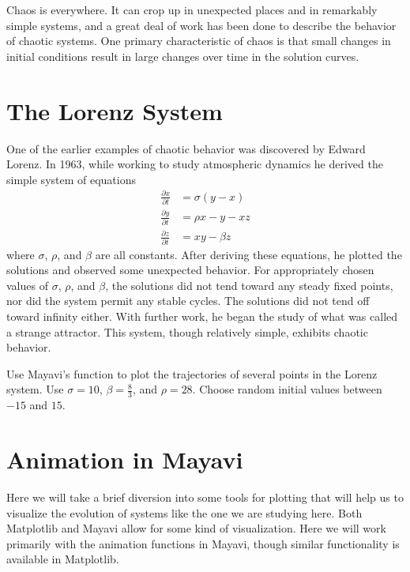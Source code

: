 \label{lab:lorenz}


Chaos is everywhere.
It can crop up in unexpected places and in remarkably simple systems, and a great deal of work has been done to describe the behavior of chaotic systems.
One primary characteristic of chaos is that small changes in initial conditions result in large changes over time in the solution curves.

\section*{The Lorenz System}
One of the earlier examples of chaotic behavior was discovered by Edward Lorenz.
In 1963, while working to study atmospheric dynamics he derived the simple system of equations
\begin{align*}
\frac{\partial x}{\partial t} &= \sigma \left(y - x\right) \\
\frac{\partial y}{\partial t} &= \rho x - y - x z \\
\frac{\partial z}{\partial t} &= x y - \beta z
\end{align*}
where $\sigma$, $\rho$, and $\beta$ are all constants.
After deriving these equations, he plotted the solutions and observed some unexpected behavior.
For appropriately chosen values of $\sigma$, $\rho$, and $\beta$, the solutions did not tend toward any steady fixed points, nor did the system permit any stable cycles.
The solutions did not tend off toward infinity either.
With further work, he began the study of what was called a strange attractor.
This system, though relatively simple, exhibits chaotic behavior.

\begin{problem}
\label{prob:lorenz_basic}
Use Mayavi's  function to plot the trajectories of several points in the Lorenz system.
Use $\sigma = 10$, $\beta = \frac{8}{3}$, and $\rho = 28$.
Choose random initial values between $-15$ and $15$.
\end{problem}

\section*{Animation in Mayavi}
Here we will take a brief diversion into some tools for plotting that will help us to visualize the evolution of systems like the one we are studying here.
Both Matplotlib and Mayavi allow for some kind of visualization.
Here we will work primarily with the animation functions in Mayavi, though similar functionality is available in Matplotlib.

